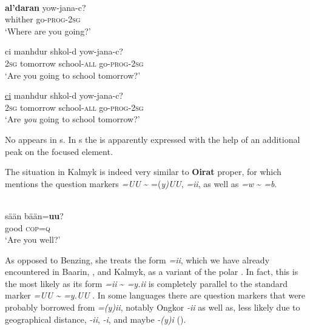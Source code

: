 \ea%
    \label{ex:mong:34}
    \\
    \ea
    \gll \textbf{{al’daran}} {yow-jana-c?}\\
    whither  go-\textsc{prog}-2\textsc{sg}\\
    \glt ‘Where are you going?’
    
    \ex
    \gll ci  manhdur  shkol-d    yow-jana-c?\\
    2\textsc{sg}  tomorrow  school-\textsc{all}  go-\textsc{prog}-2\textsc{sg}\\
    \glt ‘Are you going to school tomorrow?’
    
    \ex
    \gll \uline{ci}  manhdur  shkol-d    yow-jana-c?\\
    2\textsc{sg}  tomorrow  school-\textsc{all}  go-\textsc{prog}-2\textsc{sg}\\
    \glt ‘Are \textit{you} going to school tomorrow?’
    \z
    \z 

\noindent No  appears in s. In s the  is apparently expressed with the help of an additional peak on the focused element.

The situation in Kalmyk is indeed very similar to \textbf{Oirat} proper, for which \citet{Birtalan2003} mentions the question markers \textit{=UU} {\textasciitilde} =(\textit{y)}\textit{UU}, \textit{=ii}, as well as \textit{=w} {\textasciitilde} \textit{=b}.

\ea%
    \label{ex:mong:35}
    \\
    \gll sään  bään=\textbf{{uu}}?\\
    good  \textsc{cop}=\textsc{q}\\
    \glt ‘Are you well?’ \citep[227]{Birtalan2003}
    \z

As opposed to Benzing, she treats the form \textit{=ii}, which we have already encountered in Baarin, , and Kalmyk, as a variant of the polar . In fact, this is the most likely  as its form \textit{=ii} {\textasciitilde} \textit{=y.ii} is completely parallel to the standard marker \textit{=UU {\textasciitilde} =y.UU} \citep[183]{Janhunen2012c}. In some  languages there are question markers that were probably borrowed from  \textit{=(y)ii}, notably Ongkor  \textit{-ii} as well as, less likely due to geographical distance,  \textit{-ii},  \textit{-i}, and maybe  \textit{-}\textit{(y)i} ().

